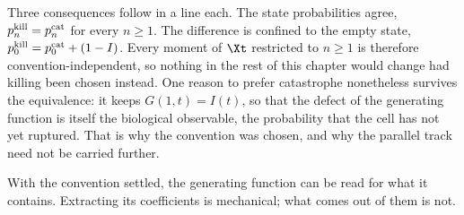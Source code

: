 Three consequences follow in a line each. The state probabilities agree,
$p_n^{\rm kill}=p_n^{\rm cat}$ for every $n\ge1$. The difference is confined
to the empty state, $p_0^{\rm kill}=p_0^{\rm cat}+(1-I)$. Every moment of
$\Xt$ restricted to $n\ge1$ is therefore convention-independent, so nothing in
the rest of this chapter would change had killing been chosen instead. One
reason to prefer catastrophe nonetheless survives the equivalence: it keeps
$G(1,t)=I(t)$, so that the defect of the generating function is itself the
biological observable, the probability that the cell has not yet ruptured.
That is why the convention was chosen, and why the parallel track need not be
carried further.

With the convention settled, the generating function can be read for what it
contains. Extracting its coefficients is mechanical; what comes out of them is
not.
